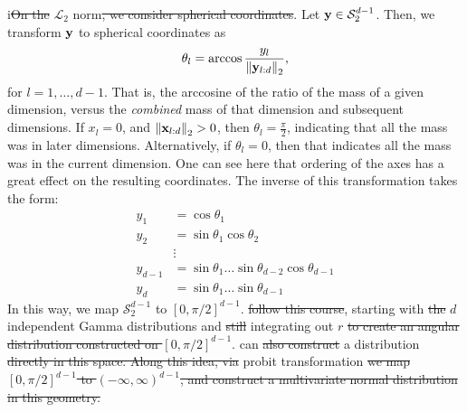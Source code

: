 i\st{On the} $\mathcal{L}_2$ norm\st{, we consider spherical coordinates}.
  Let ${\bf y} \in \mathcal{S}_{2}^{d-1}$. Then, we transform ${\bf y}$ to spherical coordinates as
  \begin{equation*}
    \theta_l = \arccos\frac{y_l}{\left\lVert {\bf y}_{l:d} \right\rVert_{2}},
  \end{equation*}
  for $l = 1,\ldots, d-1$. That is, the arccosine of the ratio of the mass of a given dimension,
  versus the \emph{combined} mass of that dimension and subsequent dimensions.  If $x_l = 0$, and
  $\left\lVert {\bf x}_{l:d} \right\rVert_{2} > 0$, then $\theta_l = \frac{\pi}{2}$, indicating that all the mass was
  in later dimensions.  Alternatively, if $\theta_l = 0$, then that indicates all the mass was in
  the current dimension.  One can see here that ordering of the axes has a great effect on the
  resulting coordinates.  The inverse of this transformation takes the form:
  \begin{equation}
    \label{eqn:spherical}
    \begin{aligned}
      y_1 &= \cos\theta_1\\
      y_2 &= \sin\theta_1\cos\theta_2\\
      &\vdots\\
      y_{d-1} &= \sin\theta_1\ldots\sin\theta_{d-2}\cos\theta_{d-1}\\
      y_d &= \sin\theta_1\ldots\sin\theta_{d-1}
    \end{aligned}
  \end{equation}
  In this way, we map $\mathcal{S}_2^{d-1}$ to $[0,\pi/2]^{d-1}$.
  \cite{nunez2019} 
  \st{follow this course}, starting with \st{the} $d$ independent Gamma distributions and \st{still} integrating out
  $r$ \st{to create an angular distribution constructed on $[0,\pi/2]^{d-1}$}.  can \st{also construct} 
  a distribution  \st{directly in this space.  Along this idea, via} probit transformation  \st{we map
  $[0,\pi/2]^{d-1}$ to $(-\infty, \infty)^{d-1}$, and construct a multivariate normal distribution
  in this geometry.}

